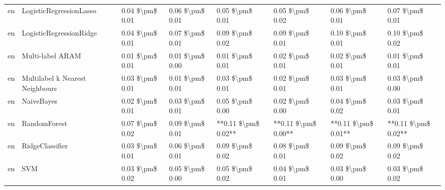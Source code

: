 \begin{tabular}{llllllll}
      en &         LogisticRegressionLasso & 0.04 \$\textbackslash pm\$ 0.01 &           0.06 \$\textbackslash pm\$ 0.01 &       0.05 \$\textbackslash pm\$ 0.01 &        0.05 \$\textbackslash pm\$ 0.02 &                         0.06 \$\textbackslash pm\$ 0.01 &     0.07 \$\textbackslash pm\$ 0.01 \\
      en &         LogisticRegressionRidge & 0.04 \$\textbackslash pm\$ 0.01 &           0.07 \$\textbackslash pm\$ 0.01 &       0.09 \$\textbackslash pm\$ 0.02 &        0.09 \$\textbackslash pm\$ 0.01 &                         0.10 \$\textbackslash pm\$ 0.01 &     0.10 \$\textbackslash pm\$ 0.02 \\
      en &                Multi-label ARAM & 0.01 \$\textbackslash pm\$ 0.01 &           0.01 \$\textbackslash pm\$ 0.00 &       0.01 \$\textbackslash pm\$ 0.01 &        0.02 \$\textbackslash pm\$ 0.01 &                         0.02 \$\textbackslash pm\$ 0.01 &     0.01 \$\textbackslash pm\$ 0.01 \\
      en & Multilabel k Nearest Neighbours & 0.03 \$\textbackslash pm\$ 0.01 &           0.01 \$\textbackslash pm\$ 0.01 &       0.03 \$\textbackslash pm\$ 0.01 &        0.02 \$\textbackslash pm\$ 0.01 &                         0.03 \$\textbackslash pm\$ 0.01 &     0.03 \$\textbackslash pm\$ 0.00 \\
      en &                      NaiveBayes & 0.02 \$\textbackslash pm\$ 0.01 &           0.03 \$\textbackslash pm\$ 0.01 &       0.05 \$\textbackslash pm\$ 0.00 &        0.02 \$\textbackslash pm\$ 0.00 &                         0.04 \$\textbackslash pm\$ 0.02 &     0.03 \$\textbackslash pm\$ 0.01 \\
      en &                    RandomForest & 0.07 \$\textbackslash pm\$ 0.02 &           0.09 \$\textbackslash pm\$ 0.01 &   **0.11 \$\textbackslash pm\$ 0.02** &    **0.11 \$\textbackslash pm\$ 0.00** &                     **0.11 \$\textbackslash pm\$ 0.01** & **0.11 \$\textbackslash pm\$ 0.02** \\
      en &                 RidgeClassifier & 0.03 \$\textbackslash pm\$ 0.01 &           0.06 \$\textbackslash pm\$ 0.01 &       0.09 \$\textbackslash pm\$ 0.02 &        0.08 \$\textbackslash pm\$ 0.01 &                         0.09 \$\textbackslash pm\$ 0.02 &     0.09 \$\textbackslash pm\$ 0.02 \\
      en &                             SVM & 0.03 \$\textbackslash pm\$ 0.02 &           0.05 \$\textbackslash pm\$ 0.00 &       0.05 \$\textbackslash pm\$ 0.02 &        0.04 \$\textbackslash pm\$ 0.01 &                         0.03 \$\textbackslash pm\$ 0.00 &     0.03 \$\textbackslash pm\$ 0.02 \\

\end{tabular}
